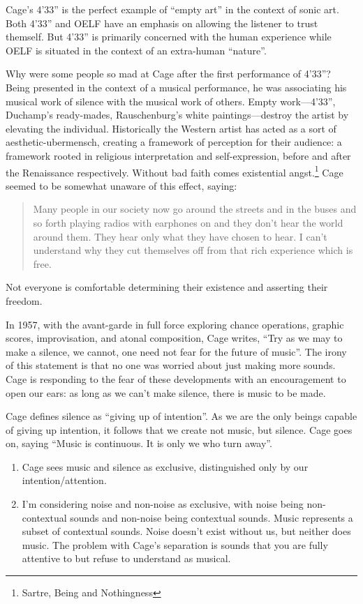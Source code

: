\documentclass{thesis}
\begin{document}
	Cage's 4'33'' is the perfect example of ``empty art'' in the context of sonic art.\cite{larry_j_solomon_sounds_1998} Both 4'33'' and OELF have an emphasis on allowing the listener to trust themself. But 4'33'' is primarily concerned with the human experience while OELF is situated in the context of an extra-human ``nature''.
	
	Why were some people so mad at Cage after the first performance of 4'33''? Being presented in the context of a musical performance, he was associating his musical work of silence with the musical work of others. Empty work---4'33'', Duchamp's ready-mades, Rauschenburg's white paintings---destroy the artist by elevating the individual. Historically the Western artist has acted as a sort of aesthetic-ubermensch, creating a framework of perception for their audience: a framework rooted in religious interpretation and self-expression, before and after the Renaissance respectively. Without bad faith comes existential angst.\footnote{Sartre, Being and Nothingness} Cage seemed to be somewhat unaware of this effect, saying:
	
\begin{quote}
	Many people in our society now go around the streets and in the buses and so forth playing radios with earphones on and they don't hear the world around them. They hear only what they have chosen to hear. I can't understand why they cut themselves off from that rich experience which is free.
\end{quote}

	Not everyone is comfortable determining their existence and asserting their freedom.
	
	In 1957, with the avant-garde in full force exploring chance operations, graphic scores, improvisation, and atonal composition, Cage writes, ``Try as we may to make a silence, we cannot, one need not fear for the future of music''. The irony of this statement is that no one was worried about just making more sounds. Cage is responding to the fear of these developments with an encouragement to open our ears: as long as we can't make silence, there is music to be made.
	
	Cage defines silence as ``giving up of intention''. As we are the only beings capable of giving up intention, it follows that we create not music, but silence. Cage goes on, saying ``Music is continuous. It is only we who turn away''.
	
\begin{enumerate}
	\item Cage sees music and silence as exclusive, distinguished only by our intention/attention.
	\item I'm considering noise and non-noise as exclusive, with noise being non-contextual sounds and non-noise being contextual sounds. Music represents a subset of contextual sounds. Noise doesn't exist without us, but neither does music. The problem with Cage's separation is sounds that you are fully attentive to but refuse to understand as musical.
\end{enumerate}
\end{document}
